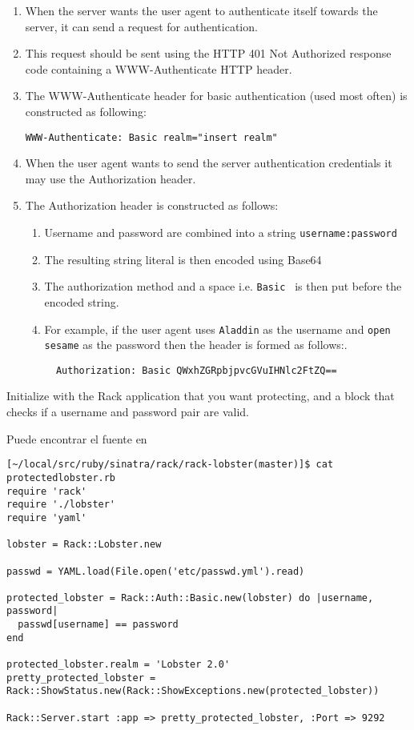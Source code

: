\begin{enumerate}
\item 
When the server wants the user agent to authenticate itself towards
the server, it can send a request for authentication.
\item 
This request should be sent using the HTTP 401 Not Authorized
response code containing a WWW-Authenticate HTTP header.
\item 
The WWW-Authenticate header for basic authentication (used most
often) is constructed as following:
\begin{verbatim}
WWW-Authenticate: Basic realm="insert realm"
\end{verbatim}
\item 
When the user agent wants to send the server authentication credentials
it may use the Authorization header.
\item 
The Authorization header is constructed as follows:
  \begin{enumerate}
  \item 
  Username and password are combined into a string \verb"username:password"
  \item 
  The resulting string literal is then encoded using Base64
  \item 
  The authorization method and a space i.e. \verb"Basic " is then put
  before the encoded string.
  \item 
  For example, if the user agent uses 
  \verb'Aladdin' as the username and
  \verb'open sesame' as the password then the header is formed as
  follows:.
  \begin{verbatim}
  Authorization: Basic QWxhZGRpbjpvcGVuIHNlc2FtZQ==
  \end{verbatim}
  \end{enumerate}
\end{enumerate}


Initialize with the Rack application that you want protecting, and
a block that checks if a username and password pair are valid.


Puede encontrar el fuente en 

\begin{verbatim}
[~/local/src/ruby/sinatra/rack/rack-lobster(master)]$ cat protectedlobster.rb
require 'rack'
require './lobster'
require 'yaml'

lobster = Rack::Lobster.new

passwd = YAML.load(File.open('etc/passwd.yml').read)

protected_lobster = Rack::Auth::Basic.new(lobster) do |username, password|
  passwd[username] == password
end

protected_lobster.realm = 'Lobster 2.0'
pretty_protected_lobster = Rack::ShowStatus.new(Rack::ShowExceptions.new(protected_lobster))

Rack::Server.start :app => pretty_protected_lobster, :Port => 9292
\end{verbatim}

